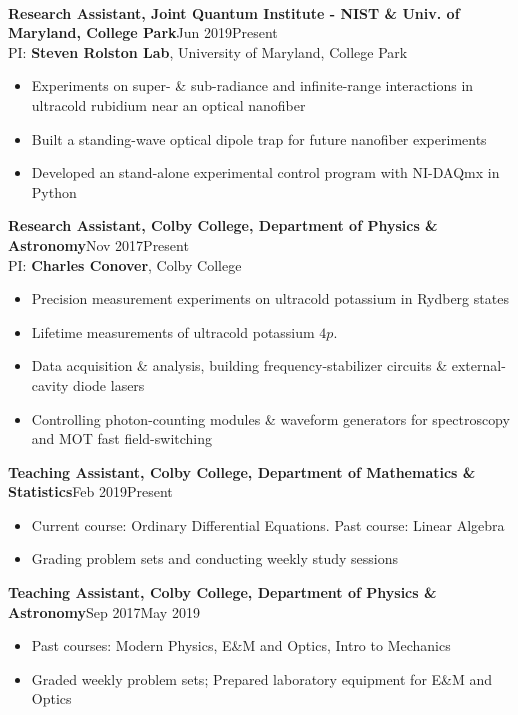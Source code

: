 \documentclass[letter, 9pt]{article}
\newcommand{\longunderline}[1]{\uline{#1\hfill\mbox{}}}
\begin{document}
	\vspace{-7pt}
	\noindent \longunderline{\normalsize{{}}}
	\\ \vspace{-7pt}
	
	\noindent \textbf{Research Assistant, Joint Quantum Institute - NIST \& Univ. of Maryland, College Park}\hfill Jun 2019\textemdash Present\\ 
	\noindent PI: \textbf{Steven Rolston Lab}, University of Maryland, College Park
	\begin{itemize}[noitemsep, nolistsep]
		\item Experiments on super- \& sub-radiance and infinite-range interactions in ultracold rubidium near an optical nanofiber
		\item Built a standing-wave optical dipole trap for future nanofiber experiments
		\item Developed an stand-alone experimental control program with NI-DAQmx in Python
	\end{itemize}
	\textbf{Research Assistant, Colby College, Department of Physics \& Astronomy}\hfill Nov 2017\textemdash Present\\
	PI: \textbf{Charles Conover}, Colby College
	\begin{itemize}[noitemsep, nolistsep]
		\item Precision measurement experiments on ultracold potassium in Rydberg states
		\item Lifetime measurements of ultracold potassium $4p$.
		\item Data acquisition \& analysis, building frequency-stabilizer circuits \& external-cavity diode lasers
		\item Controlling photon-counting modules \& waveform generators for spectroscopy and MOT fast field-switching

	\end{itemize}	
 	  \textbf{Teaching Assistant, Colby College, Department of Mathematics \& Statistics}\hfill Feb 2019\textemdash Present 
	\begin{itemize}[noitemsep, nolistsep]
		\item Current course: Ordinary Differential Equations. Past course: Linear Algebra
		\item Grading problem sets and conducting weekly study sessions 
	\end{itemize}
	 \textbf{Teaching Assistant, Colby College, Department of Physics \& Astronomy}\hfill Sep 2017\textemdash May 2019
	\begin{itemize}[noitemsep, nolistsep]
		\item Past courses: Modern Physics, E\&M and Optics, Intro to Mechanics
		\item Graded weekly problem sets; Prepared laboratory equipment for E\&M and Optics
	\end{itemize}
\end{document}
